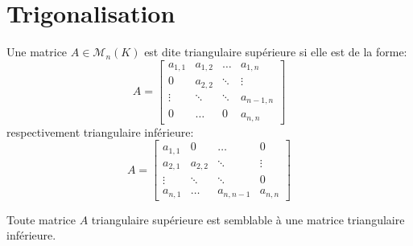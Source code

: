 \section{Trigonalisation}
Une matrice $A \in \mathcal{M}_n(K)$ est dite triangulaire supérieure si elle est de la forme:
\[
         A = 
         \begin{bmatrix} 
         a_{1,1} & a_{1,2} & \ldots & a_{1,n} \\
         0 & a_{2,2} & \ddots & \vdots\\
         \vdots & \ddots & \ddots & a_{n-1,n}\\
         0 & \ldots & 0 & a_{n,n}
        \end{bmatrix}
\] 
respectivement triangulaire inférieure:
\[
         A = 
         \begin{bmatrix} 
         a_{1,1} & 0 & \ldots & 0 \\
         a_{2, 1} & a_{2,2} & \ddots & \vdots\\
         \vdots & \ddots & \ddots & 0\\
         a_{n, 1} & \ldots & a_{n, n-1} & a_{n,n}
        \end{bmatrix} 
\] 
\begin{remark}
   Toute matrice $A$ triangulaire supérieure est semblable à une matrice triangulaire inférieure. 
\end{remark}
